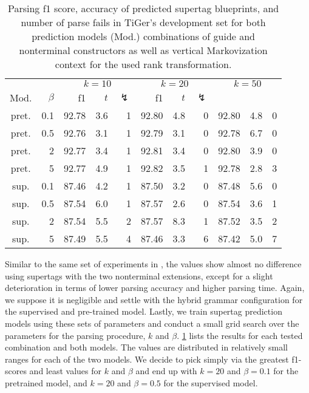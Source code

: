 \documentclass[../../document.tex]{subfiles}
\begin{document}
    \begin{table}
        \caption{\label{tbl:experiments:tiger:k}
        Parsing f1 score, accuracy of predicted  supertag blueprints, and number of parse fails in TiGer's development set for both prediction models (Mod.) combinations of guide and nonterminal constructors as well as vertical Markovization context for the used rank transformation.
        }
        \centering
        \setlength{\tabcolsep}{4pt}
        \vspace{.2cm}
        \begin{tabular}{cr|rrr|rrr|rrr}
            \toprule
&      &      \multicolumn{3}{c|}{$k = 10$} & \multicolumn{3}{c|}{$k = 20$} & \multicolumn{3}{c|}{$k = 50$} \\
Mod. &  $\beta$  & f1 & $t$ & $\lightning$ & f1 & $t$ & $\lightning$ \\ \hline
pret. & 0.1  & 92.78 & 3.6 & 1 & 92.80 & 4.8 & 0 & 92.80 & 4.8 & 0 \\
pret. & 0.5  & 92.76 & 3.1 & 1 & 92.79 & 3.1 & 0 & 92.78 & 6.7 & 0 \\
pret. &   2  & 92.77 & 3.4 & 1 & 92.81 & 3.4 & 0 & 92.80 & 3.9 & 0 \\
pret. &   5  & 92.77 & 4.9 & 1 & 92.82 & 3.5 & 1 & 92.78 & 2.8 & 3 \\
\midrule 
sup. & 0.1  & 87.46 & 4.2 & 1 & 87.50 & 3.2 & 0 & 87.48 & 5.6 & 0 \\
sup. & 0.5  & 87.54 & 6.0 & 1 & 87.57 & 2.6 & 0 & 87.54 & 3.6 & 1 \\
sup. &   2  & 87.54 & 5.5 & 2 & 87.57 & 8.3 & 1 & 87.52 & 3.5 & 2 \\
sup. &   5  & 87.49 & 5.5 & 4 & 87.46 & 3.3 & 6 & 87.42 & 5.0 & 7 \\
    \bottomrule
        \end{tabular}
    \end{table}

    Similar to the same set of experiments in , the values show almost no difference using  supertags with the two nonterminal extensions, except for a slight deterioration in terms of lower parsing accuracy and higher parsing time.
    Again, we suppose it is negligible and settle with the hybrid grammar configuration for the supervised and pre-trained model.
    Lastly, we train supertag prediction models using these sets of parameters and conduct a small grid search over the parameters for the parsing procedure, $k$ and $\beta$.
    \cref{tbl:experiments:tiger:k} lists the results for each tested combination and both models.
    The values are distributed in relatively small ranges for each of the two models.
    We decide to pick simply via the greatest f1-scores and least values for \(k\) and \(\beta\) and end up with \(k=20\) and \(\beta=0.1\) for the pretrained model, and \(k=20\) and \(\beta=0.5\) for the supervised model.
\end{document}

